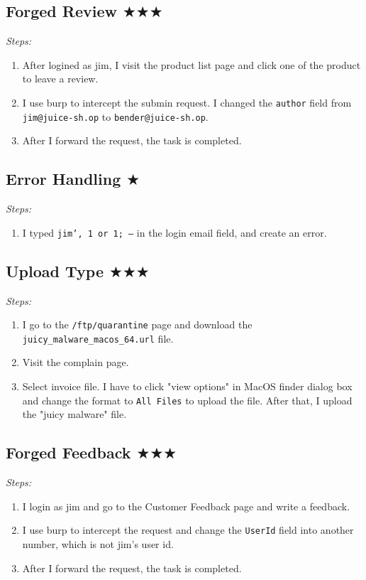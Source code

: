 \documentclass[12pt]{article}
\begin{document}
\subsection*{Forged Review $\bigstar\bigstar\bigstar$}
\textit{Steps:}
\begin{enumerate}
  \item After logined as jim, I visit the product list page and click one of the product to leave a review.
  \item I use burp to intercept the submin request. I changed the \texttt{author} field from \texttt{jim@juice-sh.op} to \texttt{bender@juice-sh.op}.
  \item After I forward the request, the task is completed.
\end{enumerate}

\subsection*{Error Handling $\bigstar$}
\textit{Steps:}
\begin{enumerate}
  \item I typed \texttt{jim', 1 or 1; --} in the login email field, and create an error.
\end{enumerate}

\subsection*{Upload Type $\bigstar\bigstar\bigstar$}
\textit{Steps:}
\begin{enumerate}
  \item I go to the \texttt{/ftp/quarantine} page and download the \texttt{juicy\_malware\_macos\_64.url} file.
  \item Visit the complain page.
  \item Select invoice file. I have to click "view options" in MacOS finder dialog box and change the format to \texttt{All Files} to upload the file. After that, I upload the "juicy malware" file.
\end{enumerate}

\subsection*{Forged Feedback $\bigstar\bigstar\bigstar$}
\textit{Steps:}
\begin{enumerate}
  \item I login as jim and go to the Customer Feedback page and write a feedback.
  \item I use burp to intercept the request and change the \texttt{UserId} field into another number, which is not jim's user id.
  \item After I forward the request, the task is completed.
\end{enumerate}
\end{document}
